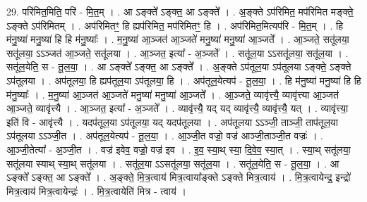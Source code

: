 \documentclass[17pt]{extarticle}
\begin{document}
29. परि॑मित॒मिति॒ परि॑ - मि॒त॒म् । . आ ऽङ्क्ते᳚ ऽङ्क्त॒ आ ऽङ्क्ते᳚ । . अ॒ङ्क्ते ऽप॑रिमित॒ मप॑रिमित मङ्क्ते॒ ऽङ्क्ते ऽप॑रिमितम् । . अप॑रिमितꣳ॒॒ हि ह्यप॑रिमित॒ मप॑रिमितꣳ॒॒ हि । . अप॑रिमित॒मित्यप॑रि - मि॒त॒म् । . हि म॑नु॒ष्या॑ मनु॒ष्या॑ हि हि म॑नु॒ष्याः᳚ । . म॒नु॒ष्या॑ आ॒ञ्जत॑ आ॒ञ्जते॑ मनु॒ष्या॑ मनु॒ष्या॑ आ॒ञ्जते᳚ । . आ॒ञ्जते॒ सतू॑लया॒ सतू॑लया॒ ऽऽञ्जत॑ आ॒ञ्जते॒ सतू॑लया । . आ॒ञ्जत॒ इत्या᳚ - अ॒ञ्जते᳚ । . सतू॑ल॒या ऽऽसतू॑लया॒ सतू॑ल॒या । . सतू॑ल॒येति॒ स - तू॒ल॒या॒ । . आ ऽङ्क्ते᳚ ऽङ्क्त॒ आ ऽङ्क्ते᳚ । . अ॒ङ्क्ते ऽप॑तूल॒या ऽप॑तूलया ऽङ्क्ते॒ ऽङ्क्ते ऽप॑तूलया । . अप॑तूलया॒ हि ह्यप॑तूल॒या ऽप॑तूलया॒ हि । . अप॑तूल॒येत्यप॑ - तू॒ल॒या॒ । . हि म॑नु॒ष्या॑ मनु॒ष्या॑ हि हि म॑नु॒ष्याः᳚ । . म॒नु॒ष्या॑ आ॒ञ्जत॑ आ॒ञ्जते॑ मनु॒ष्या॑ मनु॒ष्या॑ आ॒ञ्जते᳚ । . आ॒ञ्जते॒ व्यावृ॑त्त्यै॒ व्यावृ॑त्त्या आ॒ञ्जत॑ आ॒ञ्जते॒ व्यावृ॑त्त्यै । . आ॒ञ्जत॒ इत्या᳚ - अ॒ञ्जते᳚ । . व्यावृ॑त्त्यै॒ यद् यद् व्यावृ॑त्त्यै॒ व्यावृ॑त्त्यै॒ यत् । . व्यावृ॑त्त्या॒ इति॑ वि - आवृ॑त्त्यै । . यदप॑तूल॒या ऽप॑तूलया॒ यद् यदप॑तूलया । . अप॑तूलया ऽऽञ्जी॒ ताञ्जी॒ ताप॑तूल॒या ऽप॑तूलया ऽऽञ्जी॒त । . अप॑तूल॒येत्यप॑ - तू॒ल॒या॒ । . आ॒ञ्जी॒त वज्रो॒ वज्र॑ आञ्जी॒ताञ्जी॒त वज्रः॑ । . आ॒ञ्जी॒तेत्या᳚ - अ॒ञ्जी॒त । . वज्र॑ इवेव॒ वज्रो॒ वज्र॑ इव । . इ॒व॒ स्या॒थ् स्या॒ दि॒वे॒व॒ स्या॒त् । . स्या॒थ् सतू॑लया॒ सतू॑लया स्याथ् स्या॒थ् सतू॑लया । . सतू॑ल॒या ऽऽसतू॑लया॒ सतू॑ल॒या । . सतू॑ल॒येति॒ स - तू॒ल॒या॒ । . आ ऽङ्क्ते᳚ ऽङ्क्त॒ आ ऽङ्क्ते᳚ । . अ॒ङ्क्ते॒ मि॒त्र॒त्वाय॑ मित्र॒त्वाया᳚ङ्क्ते ऽङ्क्ते मित्र॒त्वाय॑ । . मि॒त्र॒त्वायेन्द्र॒ इन्द्रो॑ मित्र॒त्वाय॑ मित्र॒त्वायेन्द्रः॑ । . मि॒त्र॒त्वायेति॑ मित्र - त्वाय॑ । \newline
\end{document}
